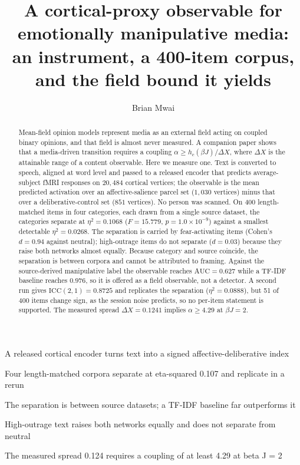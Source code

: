 \documentclass[preprint,12pt]{elsarticle}
\newif\ifcoauthor
\begin{document}
\begin{frontmatter}

\title{A cortical-proxy observable for emotionally manipulative media: an instrument, a
400-item corpus, and the field bound it yields}

\author[cuea]{Brian Mwai}
\ifcoauthor\author[cuea]{Songa Mutambi}\ead{cmutambi@cuea.edu}\fi
{}

\begin{abstract}
Mean-field opinion models represent media as an external field acting on coupled binary
opinions, and that field is almost never measured. A companion paper shows that a
media-driven transition requires a coupling $\alpha \ge h_c(\beta J)/\Delta X$, where
$\Delta X$ is the attainable range of a content observable. Here we measure one. Text is
converted to speech, aligned at word level and passed to a released encoder that predicts
average-subject fMRI responses on $20{,}484$ cortical vertices; the observable is the mean
predicted activation over an affective-salience parcel set ($1{,}030$ vertices) minus that
over a deliberative-control set ($851$ vertices). No person was scanned. On 400
length-matched items in four categories, each drawn from a single source dataset, the
categories separate at $\eta^2 = 0.1068$ ($F = 15.779$, $p = 1.0\times10^{-9}$) against a
smallest detectable $\eta^2 = 0.0268$. The separation is carried by fear-activating items
(Cohen's $d = 0.94$ against neutral); high-outrage items do not separate ($d = 0.03$)
because they raise both networks almost equally. Because category and source coincide,
the separation is between corpora and cannot be attributed to framing. Against the
source-derived manipulative label the observable reaches $\mathrm{AUC} = 0.627$ while a
TF-IDF baseline reaches $0.976$, so it is offered as a field observable, not a detector. A
second run gives $\mathrm{ICC}(2,1) = 0.8725$ and replicates the separation
($\eta^2 = 0.0888$), but 51 of 400 items change sign, as the session noise predicts, so no
per-item statement is supported. The measured spread $\Delta X = 0.1241$ implies
$\alpha \ge 4.29$ at $\beta J = 2$.
\end{abstract}

\begin{highlights}
\item A released cortical encoder turns text into a signed affective-deliberative index
\item Four length-matched corpora separate at eta-squared 0.107 and replicate in a rerun
\item The separation is between source datasets; a TF-IDF baseline far outperforms it
\item High-outrage text raises both networks equally and does not separate from neutral
\item The measured spread 0.124 requires a coupling of at least 4.29 at beta J = 2
\end{highlights}


\end{frontmatter}
\end{document}
